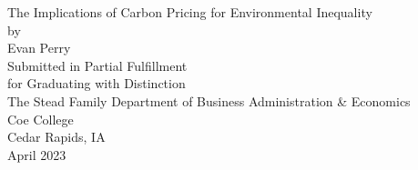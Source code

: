 \documentclass[letterpaper, 12pt]{article}
\newcommand{\1}{\mathds{1}}
\begin{document}

\begin{titlepage}
	\centering
	{\fontsize{14}{14}\selectfont The Implications of Carbon Pricing for Environmental
	Inequality}\\
	\vspace{14em}
	by\\
	Evan Perry\\
	\vspace{10em}
	Submitted in Partial Fulfillment\\
	for Graduating with Distinction\\
	\vspace{6em}
	The Stead Family Department of Business Administration \& Economics\\
	\vspace{9em}
	Coe College\\
	Cedar Rapids, IA\\
	April 2023
\end{titlepage}

\doublespacing



\newpage
\tableofcontents









\newpage





\end{document}
